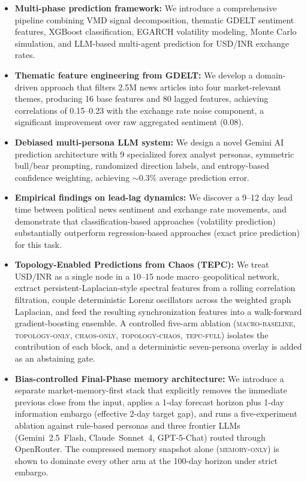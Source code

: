 \documentclass[11pt]{article}
\begin{document}
\begin{itemize}[leftmargin=*]
    \item \textbf{Multi-phase prediction framework:} We introduce a comprehensive pipeline combining VMD signal decomposition, thematic GDELT sentiment features, XGBoost classification, EGARCH volatility modeling, Monte Carlo simulation, and LLM-based multi-agent prediction for USD/INR exchange rates.
    
    \item \textbf{Thematic feature engineering from GDELT:} We develop a domain-driven approach that filters 2.5M news articles into four market-relevant themes, producing 16 base features and 80 lagged features, achieving correlations of 0.15--0.23 with the exchange rate noise component, a significant improvement over raw aggregated sentiment (0.08).
    
    \item \textbf{Debiased multi-persona LLM system:} We design a novel Gemini AI prediction architecture with 9 specialized forex analyst personas, symmetric bull/bear prompting, randomized direction labels, and entropy-based confidence weighting, achieving $\sim$0.3\% average prediction error.
    
    \item \textbf{Empirical findings on lead-lag dynamics:} We discover a 9--12 day lead time between political news sentiment and exchange rate movements, and demonstrate that classification-based approaches (volatility prediction) substantially outperform regression-based approaches (exact price prediction) for this task.

    \item \textbf{Topology-Enabled Predictions from Chaos (TEPC):} We treat USD/INR as a single node in a 10--15 node macro--geopolitical network, extract persistent-Laplacian-style spectral features from a rolling correlation filtration, couple deterministic Lorenz oscillators across the weighted graph Laplacian, and feed the resulting synchronization features into a walk-forward gradient-boosting ensemble. A controlled five-arm ablation (\textsc{macro-baseline}, \textsc{topology-only}, \textsc{chaos-only}, \textsc{topology-chaos}, \textsc{tepc-full}) isolates the contribution of each block, and a deterministic seven-persona overlay is added as an abstaining gate.

    \item \textbf{Bias-controlled Final-Phase memory architecture:} We introduce a separate market-memory-first stack that explicitly removes the immediate previous close from the input, applies a 1-day forecast horizon plus 1-day information embargo (effective 2-day target gap), and runs a five-experiment ablation against rule-based personas and three frontier LLMs (Gemini~2.5~Flash, Claude~Sonnet~4, GPT-5-Chat) routed through OpenRouter. The compressed memory snapshot alone (\textsc{memory-only}) is shown to dominate every other arm at the 100-day horizon under strict embargo.
\end{itemize}
\end{document}
